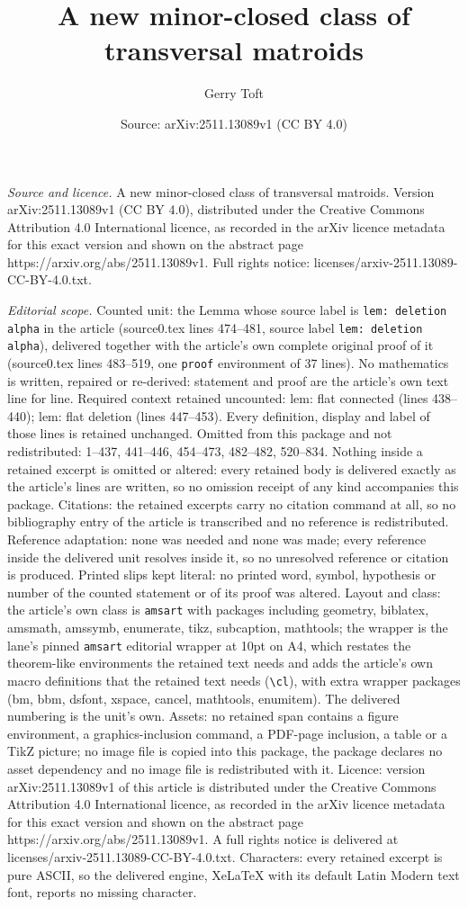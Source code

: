 \documentclass[10pt,a4paper]{amsart}
\title[A new minor-closed class of transversal matroids]{A new minor-closed class of transversal matroids}
\author{Gerry Toft}
\date{Source: arXiv:2511.13089v1 (CC BY 4.0)}
\begin{document}
\maketitle

\noindent\emph{Source and licence.} A new minor-closed class of transversal matroids. Version arXiv:2511.13089v1 (CC BY 4.0), distributed under the Creative Commons Attribution 4.0 International licence, as recorded in the arXiv licence metadata for this exact version and shown on the abstract page https://arxiv.org/abs/2511.13089v1. Full rights notice: licenses/arxiv-2511.13089-CC-BY-4.0.txt.\par\smallskip

\noindent\textit{Editorial scope.} Counted unit: the Lemma whose source label is \texttt{lem: deletion alpha} in the article (source0.tex lines 474--481, source label \texttt{lem: deletion alpha}), delivered together with the article's own complete original proof of it (source0.tex lines 483--519, one \texttt{proof} environment of 37 lines). No mathematics is written, repaired or re-derived: statement and proof are the article's own text line for line. Required context retained uncounted: lem: flat connected (lines 438--440); lem: flat deletion (lines 447--453). Every definition, display and label of those lines is retained unchanged. Omitted from this package and not redistributed: 1--437, 441--446, 454--473, 482--482, 520--834. Nothing inside a retained excerpt is omitted or altered: every retained body is delivered exactly as the article's lines are written, so no omission receipt of any kind accompanies this package. Citations: the retained excerpts carry no citation command at all, so no bibliography entry of the article is transcribed and no reference is redistributed. Reference adaptation: none was needed and none was made; every reference inside the delivered unit resolves inside it, so no unresolved reference or citation is produced. Printed slips kept literal: no printed word, symbol, hypothesis or number of the counted statement or of its proof was altered. Layout and class: the article's own class is \texttt{amsart} with packages including geometry, biblatex, amsmath, amssymb, enumerate, tikz, subcaption, mathtools; the wrapper is the lane's pinned \texttt{amsart} editorial wrapper at 10pt on A4, which restates the theorem-like environments the retained text needs and adds the article's own macro definitions that the retained text needs (\texttt{\textbackslash cl}), with extra wrapper packages (bm, bbm, dsfont, xspace, cancel, mathtools, enumitem). The delivered numbering is the unit's own. Assets: no retained span contains a figure environment, a graphics-inclusion command, a PDF-page inclusion, a table or a TikZ picture; no image file is copied into this package, the package declares no asset dependency and no image file is redistributed with it. Licence: version arXiv:2511.13089v1 of this article is distributed under the Creative Commons Attribution 4.0 International licence, as recorded in the arXiv licence metadata for this exact version and shown on the abstract page https://arxiv.org/abs/2511.13089v1. A full rights notice is delivered at licenses/arxiv-2511.13089-CC-BY-4.0.txt. Characters: every retained excerpt is pure ASCII, so the delivered engine, XeLaTeX with its default Latin Modern text font, reports no missing character.
\end{document}
